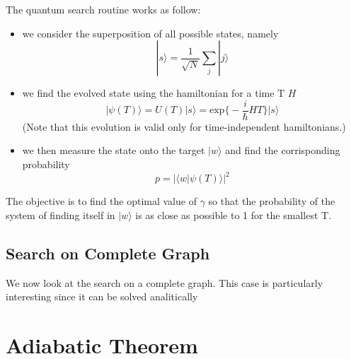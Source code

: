 The quantum search routine works as follow:
\begin{itemize}
  \item we consider the superposition of all possible states, namely
  \begin{equation}
    |s\rangle = \frac{1}{\sqrt{N}}\sum_j|j\rangle
  \end{equation}

  \item we find the evolved state using the hamiltonian for a time T $H$
  \begin{equation}
  |\psi(T)\rangle = U(T)|s\rangle  = \mbox{exp}\Big\{-\frac{i}{\hbar}HT\big\}|s\rangle
  \end{equation}
  (Note that this evolution is valid only for time-independent hamiltonians.)

  \item we then measure the state onto the target $|w\rangle$ and find the corrisponding probability
  \begin{equation}
    p = |\langle w|\psi(T)\rangle|^2
  \end{equation}

\end{itemize}

The objective is to find the optimal value of $\gamma$ so that the probability of the system of finding itself in $|w\rangle$ is as close as possible to 1 for the smallest T.

\subsection{Search on Complete Graph}
We now look at the search on a complete graph. This case is particularly interesting since it can be solved analitically\\

\section{Adiabatic Theorem}
\\


